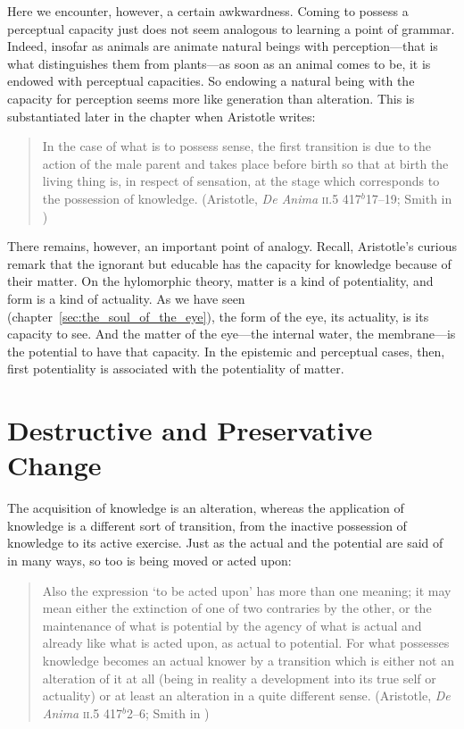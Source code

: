 Here we encounter, however, a certain awkwardness. Coming to possess a perceptual capacity just does not seem analogous to learning a point of grammar. Indeed, insofar as animals are animate natural beings with perception---that is what distinguishes them from plants---as soon as an animal comes to be, it is endowed with perceptual capacities. So endowing a natural being with the capacity for perception seems more like generation than alteration. This is substantiated later in the chapter when Aristotle writes:
\begin{quote}
	In the case of what is to possess sense, the first transition is due to the action of the male parent and takes place before birth so that at birth the living thing is, in respect of sensation, at the stage which corresponds to the possession of knowledge. (Aristotle, \emph{De Anima} \textsc{ii}.5 417\( ^{b} \)17--19; Smith in \citealt[31]{Barnes:1984uq})
\end{quote}
There remains, however, an important point of analogy. Recall, Aristotle's curious remark that the ignorant but educable has the capacity for knowledge because of their matter. On the hylomorphic theory, matter is a kind of potentiality, and form is a kind of actuality. As we have seen (chapter~\ref{sec:the_soul_of_the_eye}), the form of the eye, its actuality, is its capacity to see. And the matter of the eye---the internal water, the membrane---is the potential to have that capacity. In the epistemic and perceptual cases, then, first potentiality is associated with the potentiality of matter.


\section{Destructive and Preservative Change} %
\label{sec:destructive_and_preservative_change}

The acquisition of knowledge is an alteration, whereas the application of knowledge is a different sort of transition, from the inactive possession of knowledge to its active exercise. Just as the actual and the potential are said of in many ways, so too is being moved or acted upon:
\begin{quote}
	Also the expression ‘to be acted upon’ has more than one meaning; it may mean either the extinction of one of two contraries by the other, or the maintenance of what is potential by the agency of what is actual and already like what is acted upon, as actual to potential. For what possesses knowledge becomes an actual knower by a transition which is either not an alteration of it at all (being in reality a development into its true self or actuality) or at least an alteration in a quite different sense. (Aristotle, \emph{De Anima} \textsc{ii}.5 417\( ^{b} \)2--6; Smith in \citealt[30]{Barnes:1984uq})
\end{quote}


